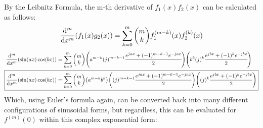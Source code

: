 \documentclass[]{article}
\begin{document}
By the Leibnitz Formula, the m-th derivative of $f_1(x) f_2(x)$ can be calculated as follows:
\[
    \dv[m]{x}\qty(f_1(x) g_2(x)) 
    = \sum_{k=0}^m \mqty(m \\ k) f_1^{(m-k)}(x) f_2^{(k)}(x)
\]
\begin{align*}
    \dv[m]{x}\qty(\sin(ax) \cos(bx)) 
        &= \sum_{k=0}^m \mqty(m \\ k) 
            \qty(a^{m - k} (j)^{m - k - 1} \cfrac{e^{j a x} + (-1)^{m - k - 1} e^{- j a x}}{2})
            \qty(b^k (j)^{k} \cfrac{e^{j b x} + (-1)^{k} e^{- j b x}}{2})\\
    \Aboxed{
    \dv[m]{x}\qty(\sin(ax) \cos(bx)) 
        &= \sum_{k=0}^m \mqty(m \\ k) \qty(a^{m - k} b^k) 
            \qty((j)^{m - k - 1} \cfrac{e^{j a x} + (-1)^{m - k - 1} e^{- j a x}}{2})
            \qty((j)^{k} \cfrac{e^{j b x} + (-1)^{k} e^{- j b x}}{2})
    }\\
\end{align*}
Which, using Euler's formula again, can be converted back into many different configurations of sinusoidal forms, but regardless, this can be evaluated for $f^{(m)}(0)$ within this complex exponential form:
\end{document}
